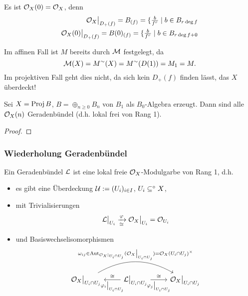\begin{bemerkung}
    Es ist $\mathcal{O}_X(0) = \mathcal{O}_X$, denn
    \begin{align*}
        \mathcal{O}_X\big|_{D_+(f)} = B_{(f)} = \{\tfrac{b}{f^r} \mid
            b \in B_{r\deg f}\\
        \mathcal{O}_X(0)\big|_{D_+(f)} = B(0)_{(f)} = \{\tfrac{b}{f^r} \mid
            b \in B_{r\deg f + 0}
    \end{align*}
\end{bemerkung}

\begin{bemerkung}
    Im affinen Fall ist $M$ bereits durch $\mathcal{M}$ festgelegt, da
    \[ \mathcal{M}(X) = M^\sim(X) = M^\sim(D(1)) = M_1 = M.\]
    Im projektiven Fall geht dies nicht, da sich kein $D_+(f)$ finden lässt,
    das $X$ überdeckt!
\end{bemerkung}

\begin{satz}
    Sei $X = \operatorname{Proj} B$, $B = \oplus_{n\geq 0} B_n$ von $B_1$ als 
    $B_0$-Algebra erzeugt. Dann sind alle $\mathcal{O}_X(n)$ Geradenbündel
    (d.h. lokal frei von Rang 1).
\end{satz}
\begin{proof}
\TODO
\end{proof}

\subsubsection{Wiederholung Geradenbündel}
\begin{definition}[Geradenbündel]
    Ein Geradenbündel $\mathcal{L}$ ist eine lokal freie $\mathcal{O}_X$-Modulgarbe
    von Rang 1, d.h. 
    \begin{itemize}
      \item es gibt eine Überdeckung $\mathcal{U} := (U_i)_{i\in I}$, $U_i\subseteq^\circ X$,
      \item mit Trivialisierungen
        \[\mathcal{L}\big|_{U_i} \xrightarrow[\cong]{\varphi} \mathcal{O}_X\big|_{U_i} = \mathcal{O}_{U_i}\]
      \item und Basiswechselisomorphismen
        \[\begin{tikzcd}
            \O_X\rest{U_i\cap U_j} 
                \ar[bend left]{rr}{\omega_{ij} \in 
                    \Aut_{\O_X|_{U_i\cap U_j}}(\O_X\rest{U_i\cap U_j})
                    = \O_X(U_i\cap U_j)^\times} 
                & \L\rest{U_i\cap U_j}
                \lar{\varphi_i\rest{U_i\cap U_j}}[swap]{\cong}
                \rar{\cong}[swap]{\varphi_j\rest{U_i\cap U_j}}
            & \O_X\rest{U_i\cap U_j}
        \end{tikzcd}\]
    \end{itemize}
\end{definition}

